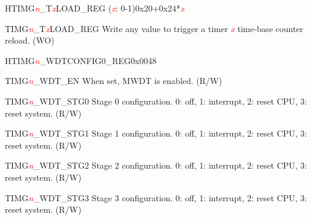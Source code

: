 \begin{register}{H}{TIMG\textcolor{red}{\it{n}}\_T\textcolor{red}{\it{x}}LOAD\_REG (\textcolor{red}{\it{x}}: 0-1)}{0x20+0x24*\textcolor{red}{\it{x}}}\label{regdesc:TIMERSTnLOADREG}
%
\regnewline%
\begin{regdesc}\begin{reglist}
\item [TIMG\textcolor{red}{\it{n}}\_T\textcolor{red}{\it{x}}LOAD\_REG]Write any value to trigger a timer \textcolor{red}{\it{x}} time-base counter reload. (WO)
\end{reglist}\end{regdesc}
\end{register}


\begin{register}{H}{TIMG\textcolor{red}{\it{n}}\_WDTCONFIG0\_REG}{0x0048}\label{regdesc:TIMERSWDTCONFIG0REG}
%
%
%
%
%
%
%
%
%
%
%
\regnewline%
\begin{regdesc}\begin{reglist}
\item [TIMG\textcolor{red}{\it{n}}\_WDT\_EN]When set, MWDT is enabled. (R/W)
\item [TIMG\textcolor{red}{\it{n}}\_WDT\_STG0]Stage 0 configuration. 0: off, 1: interrupt, 2: reset CPU, 3: reset system. (R/W)
\item [TIMG\textcolor{red}{\it{n}}\_WDT\_STG1]Stage 1 configuration. 0: off, 1: interrupt, 2: reset CPU, 3: reset system. (R/W)
\item [TIMG\textcolor{red}{\it{n}}\_WDT\_STG2]Stage 2 configuration. 0: off, 1: interrupt, 2: reset CPU, 3: reset system. (R/W)
\item [TIMG\textcolor{red}{\it{n}}\_WDT\_STG3]Stage 3 configuration. 0: off, 1: interrupt, 2: reset CPU, 3: reset system. (R/W)

\end{reglist}
\end{regdesc}
\end{register}
